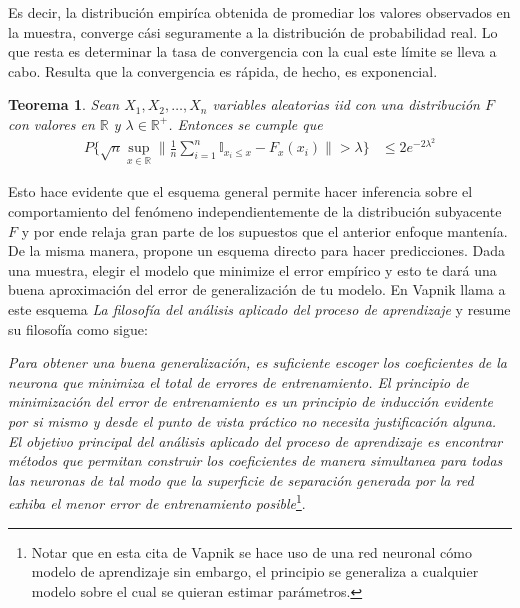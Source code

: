 \documentclass{book}
\theoremstyle{plain}
\newtheorem{thm}{Teorema}[section]
\theoremstyle{definition}
\theoremstyle{remark}
\begin{document}
Es decir, la distribución empiríca obtenida de promediar los valores observados en la muestra, converge cási seguramente a la distribución de probabilidad real. Lo que resta es determinar la tasa de convergencia con la cual este límite se lleva a cabo. Resulta que la convergencia es rápida, de hecho, es exponencial.
\bigskip

\begin{thm}
Sean $X_1,X_2,\dots,X_n$ variables aleatorias iid con una distribución $F$ con valores en $\mathbb{R}$ y $\lambda\in\mathbb{R}^+$. Entonces se cumple que
\begin{equation*}
\begin{split}
P\bigg\{\sqrt{n}\displaystyle\sup_{x\in\mathbb{R}}\bigg\|\frac{1}{n}\displaystyle\sum_{i=1}^n\mathbb{I}_{x_i\leq x}-F_{x}(x_i)\bigg\| > \lambda \bigg\}& \leq 2e^{-2\lambda^2}
\end{split}
\end{equation*}
\end{thm}

Esto hace evidente que el esquema general permite hacer inferencia sobre el comportamiento del fenómeno independientemente de la distribución subyacente $F$ y por ende relaja gran parte de los supuestos que el anterior enfoque mantenía. De la misma manera, propone un esquema directo para hacer predicciones. Dada una muestra, elegir el modelo que minimize el error empírico y esto te dará una buena aproximación del error de generalización de tu modelo. En \cite{VAPNIK2} Vapnik llama a este esquema \emph{La filosofía del análisis aplicado del proceso de aprendizaje} y resume su filosofía como sigue:

\begin{changemargin}{1.5cm}{1.5cm}
\emph{Para obtener una buena generalización, es suficiente escoger los coeficientes de la neurona que minimiza el total de errores de entrenamiento. El principio de minimización del error de entrenamiento es un principio de inducción evidente por si mismo y desde el punto de vista práctico no necesita justificación alguna. El objetivo principal del análisis aplicado del proceso de aprendizaje es encontrar métodos que permitan construir los coeficientes de manera simultanea para todas las neuronas de tal modo que la superficie de separación generada por la red exhiba el menor error de entrenamiento posible}\footnote{Notar que en esta cita de Vapnik se hace uso de una red neuronal cómo modelo de aprendizaje sin embargo, el principio se generaliza a cualquier modelo sobre el cual se quieran estimar parámetros.}.
\end{changemargin}
\end{document}
